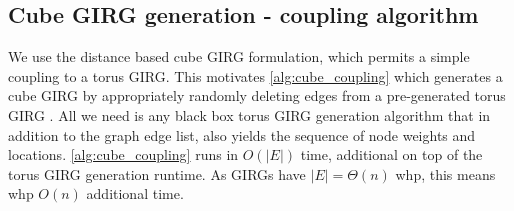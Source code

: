 

\subsection{Cube GIRG generation - coupling algorithm}
We use the distance based cube GIRG formulation, which permits a simple coupling to a torus GIRG. This motivates \cref{alg:cube_coupling} which generates a cube GIRG by appropriately randomly deleting edges from a pre-generated torus GIRG
.
All we need is any black box torus GIRG generation algorithm that in addition to the graph edge list, also yields the sequence of node weights and locations. \cref{alg:cube_coupling} runs in $O(|E|)$ time, additional on top of the torus GIRG generation runtime. As GIRGs have $|E| = \Theta(n)$ whp, this means whp $O(n)$ additional time.


